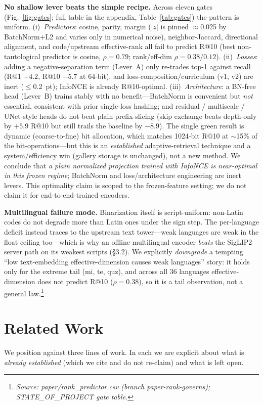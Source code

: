 \documentclass[letterpaper]{article} %
\newcommand{\src}[1]{\footnotesize\textit{Source: #1.}}
\begin{document}
\textbf{No shallow lever beats the simple recipe.} Across eleven gates (Fig.~\ref{fig:gates}; full table in the appendix,
Table~\ref{tab:gates}) the pattern is uniform. (i)~\emph{Predictors}: cosine, parity, margin
($\overline{|z|}$ is pinned $\approx$0.025 by BatchNorm$+$L2 and varies only in numerical noise),
neighbor-Jaccard, directional alignment, and code/upstream effective-rank all fail to predict R@10
(best non-tautological predictor is cosine, $\rho\!=\!0.79$; rank/eff-dim $\rho\!=\!0.38/0.12$).
(ii)~\emph{Losses}: adding a negative-separation term (Lever~A) only re-trades top-1 against recall
(R@1 $+4.2$, R@10 $-5.7$ at 64-bit), and loss-composition/curriculum (v1, v2) are inert
($\le$0.2~pt); InfoNCE is already R@10-optimal. (iii)~\emph{Architecture}: a BN-free head (Lever~B)
trains stably with no benefit---BatchNorm is convenient but \emph{not} essential, consistent with
prior single-loss hashing; and residual / multiscale / UNet-style heads do not beat plain
prefix-slicing (skip exchange beats depth-only by $+5.9$ R@10 but still trails the baseline by
$-8.9$). The single green result is dynamic (coarse-to-fine) bit allocation, which matches 1024-bit
R@10 at $\sim$15\% of the bit-operations---but this is an \emph{established} adaptive-retrieval
technique and a system/efficiency win (gallery storage is unchanged), not a new method. We conclude
that \emph{a plain normalized projection trained with InfoNCE is near-optimal in this frozen regime};
BatchNorm and loss/architecture engineering are inert levers. This optimality claim is scoped to the
frozen-feature setting; we do not claim it for end-to-end-trained encoders.

\textbf{Multilingual failure mode.} Binarization itself is script-uniform: non-Latin codes do not
degrade more than Latin ones under the sign step. The per-language deficit instead traces to the
upstream text tower---weak languages are weak in the float ceiling too---which is why an offline
multilingual encoder \emph{beats} the SigLIP2 server path on its weakest scripts (\S3.2). We
explicitly \emph{downgrade} a tempting ``low text-embedding effective-dimension causes weak
languages'' story: it holds only for the extreme tail (mi, te, quz), and across all 36 languages
effective-dimension does not predict R@10 ($\rho\!=\!0.38$), so it is a tail observation, not a
general law.\footnote{\src{paper/rank\_predictor.csv (branch paper-rank-governs); STATE\_OF\_PROJECT
gate table}}

\section{Related Work}
\label{sec:related}
We position against three lines of work. In each we are explicit about what is \emph{already
established} (which we cite and do not re-claim) and what is left open.
\end{document}
